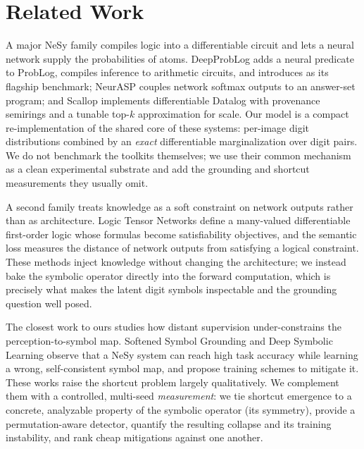 \section{Related Work}
\label{sec:related}

 A major NeSy family compiles logic into a
differentiable circuit and lets a neural network supply the probabilities of atoms. DeepProbLog
\citep{manhaeve2018} adds a neural predicate to ProbLog, compiles inference to arithmetic circuits, and
introduces \mnistadd as its flagship benchmark; NeurASP \citep{yang2020} couples network softmax
outputs to an answer-set program; and Scallop \citep{li2023scallop} implements differentiable Datalog
with provenance semirings and a tunable top-$k$ approximation for scale. Our \nesy model is a compact
re-implementation of the shared core of these systems: per-image digit distributions combined by an
\emph{exact} differentiable marginalization over digit pairs. We do not benchmark the toolkits
themselves; we use their common mechanism as a clean experimental substrate and add the grounding and
shortcut measurements they usually omit.

 A second family treats knowledge as a soft
constraint on network outputs rather than as architecture. Logic Tensor Networks \citep{badreddine2020}
define a many-valued differentiable first-order logic whose formulas become satisfiability objectives,
and the semantic loss \citep{xu2017} measures the distance of network outputs from satisfying a logical
constraint. These methods inject knowledge without changing the architecture; we instead bake the
symbolic operator directly into the forward computation, which is precisely what makes the latent
digit symbols inspectable and the grounding question well posed.

 The closest work to ours studies how
distant supervision under-constrains the perception-to-symbol map. Softened Symbol Grounding
\citep{li2024softened} and Deep Symbolic Learning \citep{deepsymbolic2022} observe that a NeSy system
can reach high task accuracy while learning a wrong, self-consistent symbol map, and propose training
schemes to mitigate it. These works raise the shortcut problem largely qualitatively. We complement
them with a controlled, multi-seed \emph{measurement}: we tie shortcut emergence to a concrete,
analyzable property of the symbolic operator (its symmetry), provide a permutation-aware detector,
quantify the resulting collapse and its training instability, and rank cheap mitigations against one
another.

